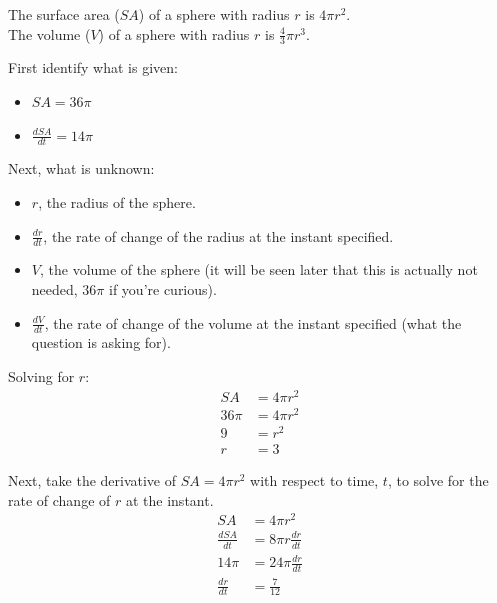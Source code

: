 \documentclass[12pt]{article}
\begin{document}
\begin{enumerate}
          \noindent The surface area ($SA$) of a sphere with radius $r$ is $4 \pi r^2$.
          \\ The volume ($V$) of a sphere with radius $r$ is $\frac{4}{3} \pi r^3$.

          \noindent First identify what is given:
          \begin{itemize}
              \item $SA = 36 \pi$
              \item $\frac{dSA}{dt} = 14 \pi$
          \end{itemize}

          \noindent Next, what is unknown:
          \begin{itemize}
              \item $r$, the radius of the sphere.
              \item $\frac{dr}{dt}$, the rate of change of the radius at the instant specified.
              \item $V$, the volume of the sphere (it will be seen later that this is actually not needed, $36 \pi$ if you're curious).
              \item $\frac{dV}{dt}$, the rate of change of the volume at the instant specified (what the question is asking for).
          \end{itemize}

          \noindent Solving for $r$:
          \begin{align*}
              SA     & = 4 \pi r^2 \\
              36 \pi & = 4 \pi r^2 \\
              9      & = r^2       \\
              r      & = 3
          \end{align*}

          \noindent Next, take the derivative of $SA = 4 \pi r^2$ with respect to time, $t$, to solve for the rate of change of $r$ at the instant.
          \begin{align*}
              SA             & = 4 \pi r^2             \\
              \frac{dSA}{dt} & = 8 \pi r \frac{dr}{dt} \\[6pt]
              14 \pi         & = 24 \pi \frac{dr}{dt}  \\[6pt]
              \frac{dr}{dt}  & = \frac{7}{12}
          \end{align*}


\end{enumerate}
\end{document}
